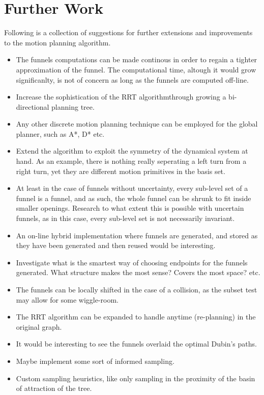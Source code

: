 \chapter{Further Work}

Following is a collection of suggestions for further extensions and improvements
to the \rrtfunnel{} motion planning algorithm.

\begin{itemize}

\item The funnels computations can be made continous in order to regain a
  tighter approximation of the funnel. The computational time, altough it would
  grow significanlty, is not of concern as long as the funnels are computed
  off-line.

\item Increase the sophistication of the \ac{RRT} algorithm\ie through growing a
  bi-directional planning tree.
  
\item Any other discrete motion planning technique can be employed for the
  global planner, such as A*, D* etc.

\item Extend the algorithm to exploit the symmetry of the dynamical system at
  hand. As an example, there is nothing really seperating a left turn from a
  right turn, yet they are different motion primitives in the basis set.

\item At least in the case of funnels without uncertainty, every sub-level set
  of a funnel is a funnel, and as such, the whole funnel can be shrunk to fit
  inside smaller openings. Research to what extent this is possible with
  uncertain funnels, as in this case, every sub-level set is not necessarily
  invariant.

  \item An on-line hybrid implementation where funnels are generated, and stored
    as they have been generated and then reused would be interesting.

  \item  Investigate what is the smartest way of choosing endpoints for the
    funnels generated. What structure makes the most sense? Covers the most
    space? etc.

  \item The funnels can be locally shifted in the case of a collision, as the
    subset test may allow for some wiggle-room.

  \item The RRT algorithm can be expanded to handle anytime (re-planning) in the
    original graph.

  \item It would be interesting to see the funnels overlaid the optimal Dubin's paths.

  \item Maybe implement some sort of informed sampling.

  \item Custom sampling heuristics, like only sampling in the proximity of the
    basin of attraction of the tree.

\end{itemize}